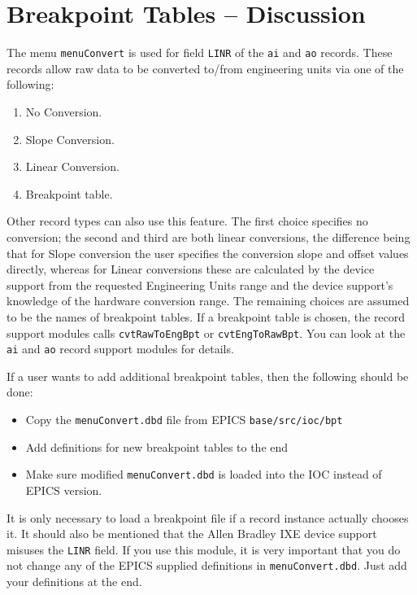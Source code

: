 \section{Breakpoint Tables -- Discussion}

The menu \verb|menuConvert| is used for field \verb|LINR| of the \verb|ai| and \verb|ao| records.
These records allow raw data to be converted to/from engineering units via one of the following:

\begin{enumerate}
\item No Conversion.
\item {}Slope Conversion.
\item {}Linear Conversion.
\item Breakpoint table.
\end{enumerate}

Other record types can also use this feature.
The first choice specifies no conversion; the second and third are both linear conversions, the difference being that for Slope conversion the user specifies the conversion slope and offset values directly, whereas for Linear conversions these are calculated by the device support from the requested Engineering Units range and the device support's knowledge of the hardware conversion range.
The remaining choices are assumed to be the names of breakpoint tables.
If a breakpoint table is chosen, the record support modules calls \verb|cvtRawToEngBpt| or \verb|cvtEngToRawBpt|.
You can look at the \verb|ai| and \verb|ao| record support modules for details.

If a user wants to add additional breakpoint tables, then the following should be done:

\begin{itemize}
\item Copy the \verb|menuConvert.dbd| file from EPICS \verb|base/src/ioc/bpt|
\item Add definitions for new breakpoint tables to the end
\item Make sure modified \verb|menuConvert.dbd| is loaded  into the IOC instead of EPICS version.
\end{itemize}

It is only necessary to load a breakpoint file if a record instance actually chooses it.
It should also be mentioned that the Allen Bradley IXE device support misuses the \verb|LINR| field.
If you use this module, it is very important that you do not change any of the EPICS supplied definitions in \verb|menuConvert.dbd|.
Just add your definitions at the end.

